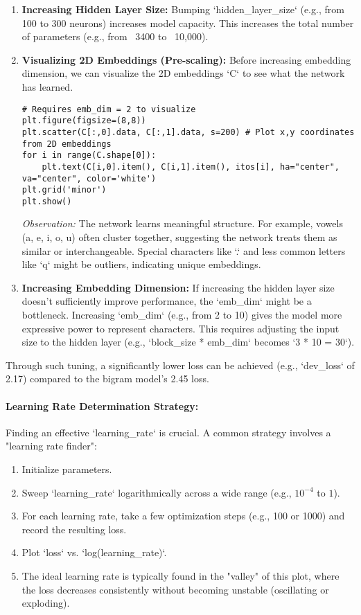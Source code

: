 \begin{enumerate}
    \item \textbf{Increasing Hidden Layer Size:} Bumping `hidden_layer_size` (e.g., from 100 to 300 neurons) increases model capacity. This increases the total number of parameters (e.g., from ~3400 to ~10,000).

    \item \textbf{Visualizing 2D Embeddings (Pre-scaling):} Before increasing embedding dimension, we can visualize the 2D embeddings `C` to see what the network has learned.
    \begin{lstlisting}[caption=Visualizing Character Embeddings (for emb_dim=2)]
# Requires emb_dim = 2 to visualize
plt.figure(figsize=(8,8))
plt.scatter(C[:,0].data, C[:,1].data, s=200) # Plot x,y coordinates from 2D embeddings
for i in range(C.shape[0]):
    plt.text(C[i,0].item(), C[i,1].item(), itos[i], ha="center", va="center", color='white')
plt.grid('minor')
plt.show()
\end{lstlisting}
    \textit{Observation:} The network learns meaningful structure. For example, vowels (a, e, i, o, u) often cluster together, suggesting the network treats them as similar or interchangeable. Special characters like `.` and less common letters like `q` might be outliers, indicating unique embeddings.

    \item \textbf{Increasing Embedding Dimension:} If increasing the hidden layer size doesn't sufficiently improve performance, the `emb_dim` might be a bottleneck. Increasing `emb_dim` (e.g., from 2 to 10) gives the model more expressive power to represent characters. This requires adjusting the input size to the hidden layer (e.g., `block_size * emb_dim` becomes `3 * 10 = 30`).
\end{enumerate}

Through such tuning, a significantly lower loss can be achieved (e.g., `dev_loss` of 2.17) compared to the bigram model's 2.45 loss.

\paragraph{Learning Rate Determination Strategy:}
Finding an effective `learning_rate` is crucial. A common strategy involves a "learning rate finder":
\begin{enumerate}
    \item Initialize parameters.
    \item Sweep `learning_rate` logarithmically across a wide range (e.g., $10^{-4}$ to $1$).
    \item For each learning rate, take a few optimization steps (e.g., 100 or 1000) and record the resulting loss.
    \item Plot `loss` vs. `log(learning_rate)`.
    \item The ideal learning rate is typically found in the "valley" of this plot, where the loss decreases consistently without becoming unstable (oscillating or exploding).
\end{enumerate}

